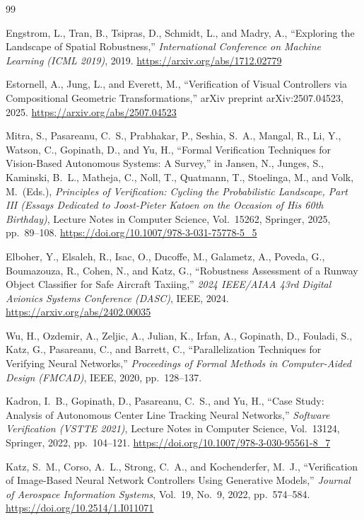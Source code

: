 \documentclass[twocolumn,smallextended,runningheads]{svjour3}
\begin{document}
\begin{thebibliography}{99}

Engstrom, L., Tran, B., Tsipras, D., Schmidt, L., and Madry, A., ``Exploring the Landscape of Spatial Robustness,'' \emph{International Conference on Machine Learning (ICML 2019)}, 2019. \url{https://arxiv.org/abs/1712.02779}

Estornell, A., Jung, L., and Everett, M., ``Verification of Visual Controllers via Compositional Geometric Transformations,'' arXiv preprint arXiv:2507.04523, 2025. \url{https://arxiv.org/abs/2507.04523}

Mitra, S., Pasareanu, C.~S., Prabhakar, P., Seshia, S.~A., Mangal, R., Li, Y., Watson, C., Gopinath, D., and Yu, H., ``Formal Verification Techniques for Vision-Based Autonomous Systems: A Survey,'' in Jansen, N., Junges, S., Kaminski, B.~L., Matheja, C., Noll, T., Quatmann, T., Stoelinga, M., and Volk, M.\ (Eds.), \emph{Principles of Verification: Cycling the Probabilistic Landscape, Part III (Essays Dedicated to Joost-Pieter Katoen on the Occasion of His 60th Birthday)}, Lecture Notes in Computer Science, Vol.~15262, Springer, 2025, pp.~89--108. \url{https://doi.org/10.1007/978-3-031-75778-5_5}

Elboher, Y., Elsaleh, R., Isac, O., Ducoffe, M., Galametz, A., Poveda, G., Boumazouza, R., Cohen, N., and Katz, G., ``Robustness Assessment of a Runway Object Classifier for Safe Aircraft Taxiing,'' \emph{2024 IEEE/AIAA 43rd Digital Avionics Systems Conference (DASC)}, IEEE, 2024. \url{https://arxiv.org/abs/2402.00035}

Wu, H., Ozdemir, A., Zeljic, A., Julian, K., Irfan, A., Gopinath, D., Fouladi, S., Katz, G., Pasareanu, C., and Barrett, C., ``Parallelization Techniques for Verifying Neural Networks,'' \emph{Proceedings of Formal Methods in Computer-Aided Design (FMCAD)}, IEEE, 2020, pp.~128--137.

Kadron, I.~B., Gopinath, D., Pasareanu, C.~S., and Yu, H., ``Case Study: Analysis of Autonomous Center Line Tracking Neural Networks,'' \emph{Software Verification (VSTTE 2021)}, Lecture Notes in Computer Science, Vol.~13124, Springer, 2022, pp.~104--121. \url{https://doi.org/10.1007/978-3-030-95561-8_7}

Katz, S.~M., Corso, A.~L., Strong, C.~A., and Kochenderfer, M.~J., ``Verification of Image-Based Neural Network Controllers Using Generative Models,'' \emph{Journal of Aerospace Information Systems}, Vol.~19, No.~9, 2022, pp.~574--584. \url{https://doi.org/10.2514/1.I011071}


\end{thebibliography}
\end{document}
